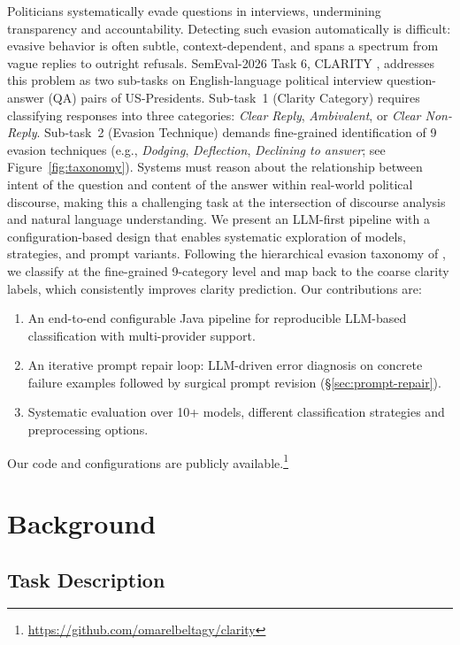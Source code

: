 \documentclass[11pt]{article}
\begin{document}
Politicians systematically evade questions in interviews, undermining transparency and accountability.
Detecting such evasion automatically is difficult: evasive behavior is often subtle, context-dependent, and spans a spectrum from vague replies to outright refusals.
SemEval-2026 Task 6, CLARITY \citep{thomas2024isaidthatdataset}, addresses this problem as two sub-tasks on English-language political interview question-answer (QA) pairs of US-Presidents.
Sub-task~1 (Clarity Category) requires classifying responses into three categories: \emph{Clear Reply}, \emph{Ambivalent}, or \emph{Clear Non-Reply}.
Sub-task~2 (Evasion Technique) demands fine-grained identification of 9 evasion techniques (e.g., \emph{Dodging}, \emph{Deflection}, \emph{Declining to answer}; see Figure~\ref{fig:taxonomy}).
Systems must reason about the relationship between intent of the question and content of the answer within real-world political discourse, making this a challenging task at the intersection of discourse analysis and natural language understanding.
We present an LLM-first pipeline with a configuration-based design that enables systematic exploration of models, strategies, and prompt variants.
Following the hierarchical evasion taxonomy of \citet{thomas2024isaidthatdataset}, we classify at the fine-grained 9-category level and map back to the coarse clarity labels, which consistently improves clarity prediction.
Our contributions are:
\begin{enumerate}[nosep,leftmargin=*]
    \item An end-to-end configurable Java pipeline for reproducible LLM-based classification with multi-provider support.
    \item An iterative prompt repair loop: LLM-driven error diagnosis on concrete failure examples followed by surgical prompt revision (\S\ref{sec:prompt-repair}).
    \item Systematic evaluation over 10+ models, different classification strategies and preprocessing options.
\end{enumerate}
Our code and configurations are publicly available.\footnote{\url{https://github.com/omarelbeltagy/clarity}}


\section{Background}

\subsection{Task Description}
\end{document}
